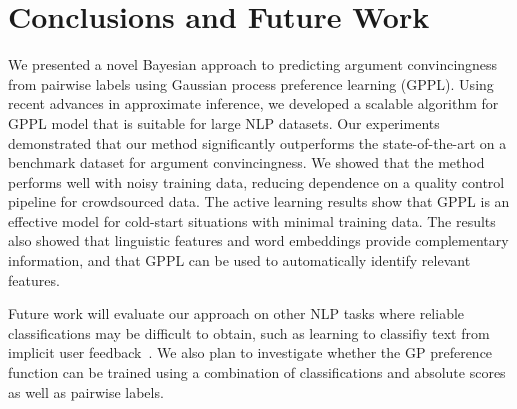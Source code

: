 \section{Conclusions and Future Work}

We presented a novel Bayesian approach to predicting argument convincingness from pairwise labels using
Gaussian process preference learning (GPPL).
Using recent advances in approximate inference, we developed a scalable algorithm for GPPL model 
that is suitable for large NLP datasets.
Our experiments demonstrated that our method significantly outperforms the state-of-the-art
on a benchmark dataset for argument convincingness.
We showed that the method performs well with noisy training data, 
reducing dependence on a quality control pipeline for crowdsourced data. 
The active learning results show that GPPL is an effective model 
for cold-start situations with minimal training data.
The results also showed that linguistic features and word embeddings provide complementary information,
and that GPPL can be used to automatically identify relevant features.

Future work will evaluate our approach on other NLP tasks 
where reliable classifications may be difficult to obtain, 
such as learning to classifiy text from implicit user feedback~\cite{joachims2002optimizing}.
We also plan to investigate whether the GP preference function can be trained 
using a combination of classifications and absolute scores as well as pairwise labels.
